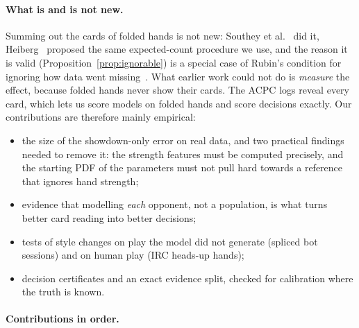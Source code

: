 \documentclass[11pt,a4paper]{article}
\newcommand{\1}{\mathbf{1}}
\begin{document}
\paragraph{What is and is not new.} Summing out the cards of folded hands is
not new: Southey et al.~\cite{southey2005} did it, Heiberg~\cite{heiberg2013}
proposed the same expected-count procedure we use, and the reason it is valid
(Proposition~\ref{prop:ignorable}) is a special case of Rubin's condition for
ignoring how data went missing~\cite{rubin1976}. What earlier work could not do
is \emph{measure} the effect, because folded hands never show their cards. The
ACPC logs reveal every card, which lets us score models on folded hands and
score decisions exactly. Our contributions are therefore mainly empirical:
\begin{itemize}
  \item the size of the showdown-only error on real data, and two practical
        findings needed to remove it: the strength features must be computed
        precisely, and the starting PDF of the parameters must not pull hard
        towards a reference that ignores hand strength;
  \item evidence that modelling \emph{each} opponent, not a population, is what
        turns better card reading into better decisions;
  \item tests of style changes on play the model did not generate (spliced bot
        sessions) and on human play (IRC heads-up hands);
  \item decision certificates and an exact evidence split, checked for
        calibration where the truth is known.
\end{itemize}

\paragraph{Contributions in order.}
\end{document}
